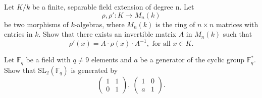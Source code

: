 \begin{prob}[F2000-Q3]
    Let \(K/k\) be a finite, separable field extension of degree n. Let
    \[\rho, \rho' : K \to M_n(k)\]
    be two morphisms of \(k\)-algebras, where \(M_n(k)\) is the ring of \(n \times n\) matrices with entries in \(k\). Show that there exists an invertible matrix \(A\) in \(M_n(k)\) such that
    \[\rho'(x)=A \cdot \rho(x) \cdot A^{-1}, \text{ for all } x \in K.\]
\end{prob}

\begin{prob}[F2019-Q1]
    Let \(\mathbb{F}_{q}\) be a field with \(q\neq 9\) elements and \(a\) be a generator of the cyclic group \(\mathbb{F}^{*}_{q}\). Show that \(\mathrm{SL}_{2}(\mathbb{F}_{q})\) is generated by
    \[\left(\begin{array}{cc}1&1\\0&1\end{array}\right),\ \left(\begin{array}{cc}1&0\\a&1\end{array}\right).\]
\end{prob}